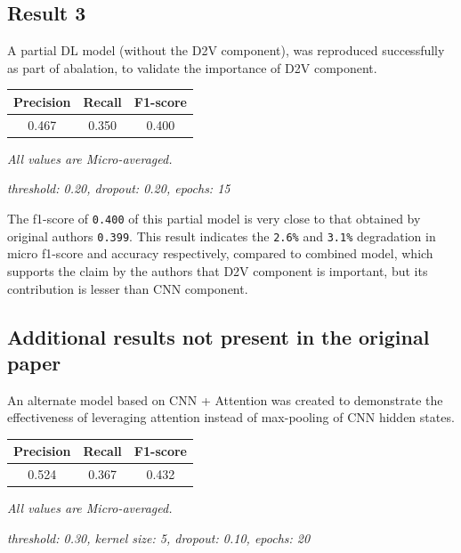 \documentclass[11pt,a4paper]{article}
\begin{document}
\subsection{Result 3}

A partial DL model (without the D2V component), was reproduced successfully as part of abalation, to validate the importance of D2V component.
\newline

\begin{small}
\begin{tabular}{ ccc }
  \hline
  	Precision & Recall & F1-score \\
  \hline
  	0.467 & 0.350 & 0.400 \\
  \hline
\end{tabular}

\textit{All values are Micro-averaged.}

\textit{threshold: 0.20, dropout: 0.20, epochs: 15}
\end{small}
\newline


The f1-score of \texttt{0.400} of this partial model is very close to that obtained by original authors \texttt{0.399}. This result indicates the \texttt{2.6\%} and \texttt{3.1\%} degradation in micro f1-score and accuracy respectively, compared to combined model, which supports the claim by the authors that D2V component is important, but its contribution is lesser than CNN component.

\subsection{Additional results not present in the original paper}

An alternate model based on CNN + Attention was created to demonstrate the effectiveness of leveraging attention instead of max-pooling of CNN hidden states.
\newline

\begin{small}
\begin{tabular}{ ccc }
  \hline
  	Precision & Recall & F1-score \\
  \hline
  	0.524 & 0.367 & 0.432 \\
  \hline
\end{tabular}

\textit{All values are Micro-averaged.}

\textit{threshold: 0.30, kernel size: 5, dropout: 0.10, epochs: 20}
\end{small}
\newline
\end{document}
